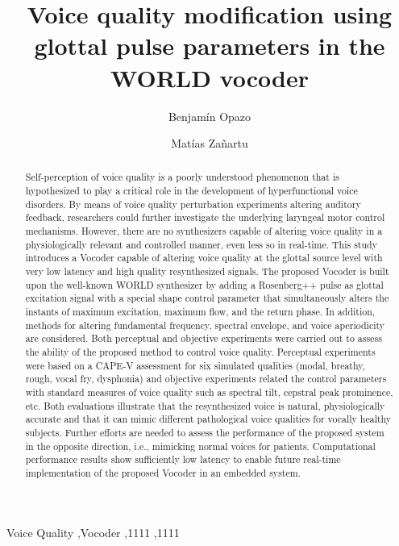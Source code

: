\documentclass[final,5p,times,twocolumn]{elsarticle}
\begin{document}
\begin{frontmatter}

\title{Voice quality modification using glottal pulse parameters in the WORLD vocoder}

\author[inst1]{Benjamín Opazo}
\author[inst1]{Matías Zañartu}


\begin{abstract}
Self-perception of voice quality is a poorly understood phenomenon that is hypothesized to play a critical role in the development of hyperfunctional voice disorders.  By means of voice quality perturbation experiments altering auditory feedback, researchers could further investigate the underlying laryngeal motor control mechanisms. However, there are no synthesizers capable of altering voice quality in a physiologically relevant and controlled manner, even less so in real-time. This study introduces a Vocoder capable of altering voice quality at the glottal source level with very low latency and high quality resynthesized signals. The proposed Vocoder is built upon the well-known WORLD synthesizer by adding a Rosenberg++ pulse as glottal excitation signal with a special shape control parameter that simultaneously alters the instants of maximum excitation, maximum flow, and the return phase. In addition, methods for altering fundamental frequency, spectral envelope, and voice aperiodicity are considered.  Both perceptual and objective experiments were carried out to assess the ability of the proposed method to control voice quality. Perceptual experiments were based on a CAPE-V assessment for six simulated qualities (modal, breathy, rough, vocal fry, dysphonia) and objective experiments related the control parameters with standard measures of voice quality such as spectral tilt, cepstral peak prominence, etc. Both evaluations illustrate that the resynthesized voice is natural, physiologically accurate and that it can mimic different pathological voice qualities for vocally healthy subjects. Further efforts are needed to assess the performance of the proposed system in the opposite direction, i.e., mimicking normal voices for patients. Computational performance results show sufficiently low latency to enable future real-time implementation of the proposed Vocoder in an embedded system.
\end{abstract}

\begin{keyword}
Voice Quality \sep Vocoder
 \sep 1111
 \sep 1111
\end{keyword}

\end{frontmatter}
\end{document}
